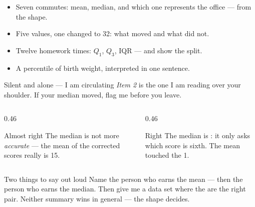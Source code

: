 \documentclass[aspectratio=169, 11pt]{beamer}
\begin{document}
\begin{frame}[t, plain]
  \begin{itemize}\setlength{\itemsep}{7pt}
    \item Seven commutes: mean, median, and which one represents the office --- from the shape.
    \item Five values, one changed to 32: what moved and what did not.
    \item Twelve homework times: $Q_1$, $Q_3$, IQR --- and show the split.
    \item A percentile of birth weight, interpreted in one sentence.
  \end{itemize}
  \begin{block}{Silent and alone --- I am circulating}
    \emph{Item 2} is the one I am reading over your shoulder. If your median moved, flag me
    before you leave.
  \end{block}
\end{frame}

\begin{frame}[t, plain]
  \vspace{6pt}
  \begin{columns}[t]
    \begin{column}{0.46\textwidth}
      \begin{block}{Almost right}
        The median is not more \emph{accurate} --- the mean of the corrected scores really
        is 15.
      \end{block}
    \end{column}
    \begin{column}{0.46\textwidth}
      \begin{block}{Right}
        The median is : it only asks which score is sixth. The mean
        touched the 1.
      \end{block}
    \end{column}
  \end{columns}
  \vspace{14pt}
  \begin{block}{Two things to say out loud}
    Name the person who earns the mean --- then the person who earns the median. Then give me
    a data set where the  are the right pair. Neither
    summary wins in general --- the shape decides.
  \end{block}
\end{frame}
\end{document}

